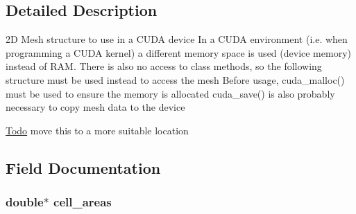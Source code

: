

\subsection{Detailed Description}
2D Mesh structure to use in a CUDA device In a CUDA environment (i.e. when programming a CUDA kernel) a different memory space is used (device memory) instead of RAM. There is also no access to class methods, so the following structure must be used instead to access the mesh Before usage, cuda\_\-malloc() must be used to ensure the memory is allocated cuda\_\-save() is also probably necessary to copy mesh data to the device

\begin{Desc}
\item[\hyperlink{todo__todo000002}{Todo}]move this to a more suitable location \end{Desc}


\subsection{Field Documentation}
\hypertarget{structFVL_1_1CFVMesh2D__cuda_ae8676892fd56ea5c4828b46ed48c222d}{
\subsubsection[{cell\_\-areas}]{\setlength{\rightskip}{0pt plus 5cm}double$\ast$ {\bf cell\_\-areas}}}
\label{dd/d46/structFVL_1_1CFVMesh2D__cuda_ae8676892fd56ea5c4828b46ed48c222d}


